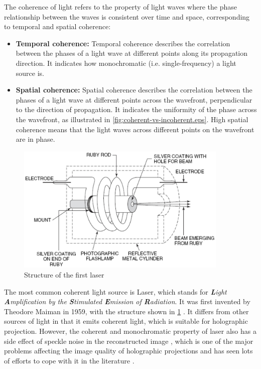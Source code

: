 The coherence of light refers to the property of light waves where the phase relationship between the waves is consistent over time and space, corresponding to temporal and spatial coherence:
\begin{itemize}
  \item \textbf{Temporal coherence:} Temporal coherence describes the correlation between the phases of a light wave at different points along its propagation direction. It indicates how monochromatic (i.e. single-frequency) a light source is.
  \item \textbf{Spatial coherence:} Spatial coherence describes the correlation between the phases of a light wave at different points across the wavefront, perpendicular to the direction of propagation. It indicates the uniformity of the phase across the wavefront, as illustrated in \cref{fig:coherent-vs-incoherent.eps}. High spatial coherence means that the light waves across different points on the wavefront are in phase.
\end{itemize}

\begin{figure}[H]
	\centering
	\includegraphics[width=0.9\textwidth]{first_laser.jpg}
	\caption{Structure of the first laser \cite{Hecht2008}}
	\label{fig:first_laser}
\end{figure}

The most common coherent light source is Laser, which stands for \textit{\textbf{L}ight \textbf{A}mplification by the \textbf{S}timulated \textbf{E}mission of \textbf{R}adiation}. It was first invented by Theodore Maiman in 1959, with the structure shown in \cref{fig:first_laser} \cite{Hecht2008, Gordon1959, Cartlidge2007}. It differs from other sources of light in that it emits coherent light, which is suitable for holographic projection. However, the coherent and monochromatic property of laser also has a side effect of speckle noise in the reconstructed image \cite{John1966}, which is one of the major problems affecting the image quality of holographic projections and has seen lots of efforts to cope with it in the literature \cite{Cable2004,Stangner2017,Deng2021,Hands2022}.


